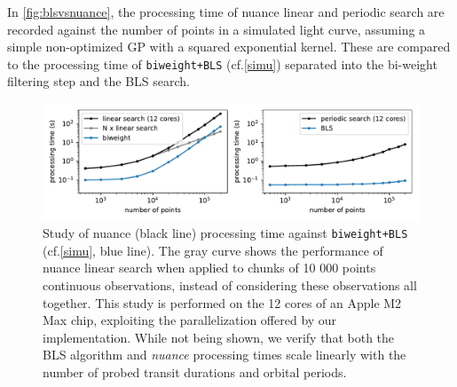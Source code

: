 \documentclass[modern]{aastex631}
\newcommand{\nuancemethod}{\textit{nuance}}
\newcommand{\nuancecode}{\textsf{nuance}}
\begin{document}
\noindent In \autoref{fig:blsvsnuance}, the processing time of \nuancecode{} linear and periodic search are recorded against the number of points in a simulated light curve, assuming a simple non-optimized GP with a squared exponential kernel. These are compared to the processing time of \texttt{biweight+BLS} (cf.\;\autoref{simu}) separated into the bi-weight filtering step and the BLS search.
\begin{figure}[H]
    \begin{centering}
        \includegraphics[width=\linewidth]{../workflows/benchmark/figures/nuance_vs_bls.pdf}
        \caption{Study of \textsf{nuance} (black line) processing time against \texttt{biweight+BLS} (cf.\;\autoref{simu}, blue line). The gray curve shows the performance of \textsf{nuance} linear search when applied to chunks of 10 000 points continuous observations, instead of considering these observations all together. This study is performed on the 12 cores of an Apple M2 Max chip, exploiting the parallelization offered by our implementation. While not being shown, we verify that both the BLS algorithm and \nuancemethod{} processing times scale linearly with the number of probed transit durations and orbital periods.}
        \label{fig:blsvsnuance}
    \end{centering}
\end{figure}
\end{document}
